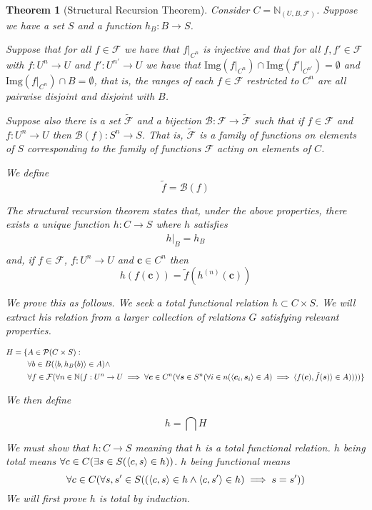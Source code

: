 \documentclass[12pt]{article}
\theoremstyle{break}
\theoremstyle{break}
\newtheorem{theorem}{Theorem}[section]
\theoremstyle{break}
\theoremstyle{break}
\theoremstyle{break}
\newtheorem{informal definition}[definition]{Informal Definition}
\newcommand{\bv}[1]{\boldsymbol{#1}}
\begin{document}
\begin{theorem}[Structural Recursion Theorem]
Consider $C = \mathbb{N}_{(U, B, \mathcal{F})}$.
Suppose we have a set $S$ and a function $h_B:B \to S$.

Suppose that for all $f\in \mathcal{F}$ we have that $f|_{C^n}$ is injective and that for all $f, f' \in \mathcal{F}$ with $f:U^n \to U$ and $f': U^{n'} \to U$ we have that $\text{Img}(f|_{C^n}) \cap \text{Img}(f'|_{C^{n'}}) = \emptyset$ and $\text{Img}(f|_{C^n}) \cap B = \emptyset$, that is, the ranges of each $f\in \mathcal{F}$ restricted to $C^n$ are all pairwise disjoint and disjoint with $B$.

Suppose also there is a set $\tilde{\mathcal{F}}$ and a bijection $\mathcal{B}: \mathcal{F} \to \tilde{\mathcal{F}}$ such that if $f\in \mathcal{F}$ and $f: U^n \to U$ then $\mathcal{B}(f): S^n \to S$.
That is, $\tilde{\mathcal{F}}$ is a family of functions on elements of $S$ corresponding to the family of functions $\mathcal{F}$ acting on elements of $C$.

We define
$$
\tilde{f} = \mathcal{B}(f)
$$

The structural recursion theorem states that, under the above properties, there exists a unique function $h:C \to S$ where $h$ satisfies
\begin{align*}
h|_B = h_B \\
\end{align*}
and, if $f\in \mathcal{F}$, $f:U^n \to U$ and $\bv{c} \in C^n$ then
$$
h(f(\bv{c})) = \tilde{f}(h^{(n)}(\bv{c}))
$$

We prove this as follows.
We seek a total functional relation $h \subset C\times S$.
We will extract his relation from a larger collection of relations $G$ satisfying relevant properties.

\tiny
\begin{align*}
H = \{&A \in \mathcal{P}(C \times S): \\
&\forall b \in B (\Braket{b, h_B(b)} \in A) \land \\
&\forall f \in \mathcal{F}(\forall n \in \mathbb{N}(f:U^n \to U \implies \forall \bv{c} \in C^n (\forall \bv{s}\in S^n (\forall i \in n(\braket{\bv{c}_i, \bv{s}_i} \in A) \implies \braket{f(\bv{c}), \tilde{f}(\bv{s})}\in A))))\}
\end{align*}

\normalsize
We then define

$$
h = \bigcap H
$$

We must show that $h: C \to S$ meaning that $h$ is a total functional relation.
$h$ being total means $\forall c \in C(\exists s\in S(\braket{c, s} \in h))$.
$h$ being functional means
$$
\forall c \in C(\forall s, s' \in S((\braket{c, s}\in h \land \braket{c, s'}\in h) \implies s=s'))
$$
We will first prove $h$ is total by induction.


\end{theorem}
\end{document}
